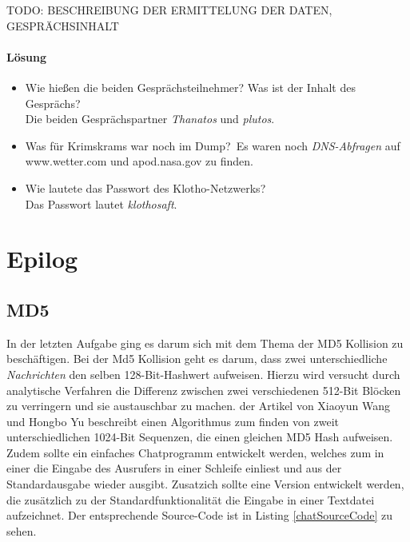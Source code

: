 \documentclass[12pt]{article}
\begin{document}
TODO: BESCHREIBUNG DER ERMITTELUNG DER DATEN, GESPRÄCHSINHALT

\paragraph{Lösung}
\begin{itemize}
	\item Wie hießen die beiden Gesprächsteilnehmer? Was ist der Inhalt des Gesprächs?\\
		Die beiden Gesprächspartner \textit{Thanatos} und \textit{plutos}.
	\item Was für Krimskrams war noch im Dump?\
		Es waren noch \textit{DNS-Abfragen} auf www.wetter.com und apod.nasa.gov zu finden.
	\item Wie lautete das Passwort des Klotho-Netzwerks?\\
		Das Passwort lautet \textit{klothosaft}.
\end{itemize}

\section{Epilog}

\subsection{MD5}

In der letzten Aufgabe ging es darum sich mit dem Thema der MD5 Kollision zu beschäftigen. Bei der Md5 Kollision geht es darum, dass zwei unterschiedliche \textit{Nachrichten} den selben 128-Bit-Hashwert aufweisen. Hierzu wird versucht durch analytische Verfahren die Differenz zwischen zwei verschiedenen 512-Bit Blöcken zu verringern und sie austauschbar zu machen. der Artikel von 
Xiaoyun Wang und Hongbo Yu beschreibt einen Algorithmus zum finden von zweit unterschiedlichen 1024-Bit Sequenzen, die einen gleichen MD5 Hash aufweisen.\\

Zudem sollte ein einfaches Chatprogramm entwickelt werden, welches zum in einer die Eingabe des Ausrufers in einer Schleife einliest und aus der Standardausgabe wieder ausgibt. Zusatzich sollte eine Version entwickelt werden, die zusätzlich zu der Standardfunktionalität die Eingabe in einer Textdatei aufzeichnet. Der entsprechende Source-Code ist in Listing \ref{chatSourceCode} zu sehen. \\
\end{document}
